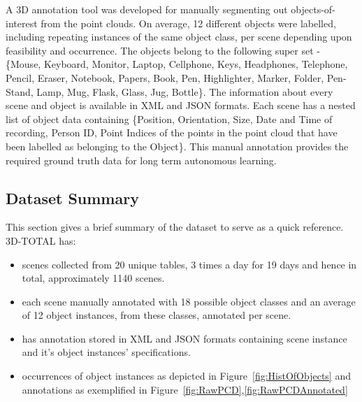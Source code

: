 \documentclass[letterpaper, 10 pt, conference]{ieeeconf}  %
\begin{document}
A 3D annotation tool was developed for manually segmenting out objects-of-interest from the point clouds. On average, 12 different objects 
were labelled, including repeating instances of the same object class, per scene depending upon feasibility and occurrence. The objects 
belong to the following super set - \{Mouse, Keyboard, Monitor, Laptop, Cellphone, Keys, Headphones, Telephone, Pencil, Eraser, Notebook, 
Papers,  Book, Pen, Highlighter, Marker, Folder, Pen-Stand, Lamp, Mug, Flask, Glass, Jug, Bottle\}. The information about every scene and 
object is available in  XML and JSON formats. Each scene has a nested list of object data containing \{Position, Orientation, Size, Date and 
Time of recording, Person ID, Point Indices of the points in the point cloud that have been labelled as belonging to the Object\}. This 
manual annotation provides the required ground truth data for long term autonomous learning.

\subsection{Dataset Summary}
\label{ssec:Dataset Summary}
This section gives a brief summary of the dataset to serve as a quick reference.
\noindent 3D-TOTAL has:
\begin{itemize}
	\item scenes collected from 20 unique tables, 3 times a day for 19 days and hence in total, approximately 1140 scenes.
	\item each scene manually annotated with 18 possible object classes and an average of 12 object instances, from these classes, annotated per scene.
	\item has annotation stored in XML and JSON formats containing scene instance and it's object instances' specifications.
	\item occurrences of object instances as depicted in Figure~\ref{fig:HistOfObjects} and annotations as exemplified in Figure~\ref{fig:RawPCD},\ref{fig:RawPCDAnnotated}
\end{itemize}
\end{document}
